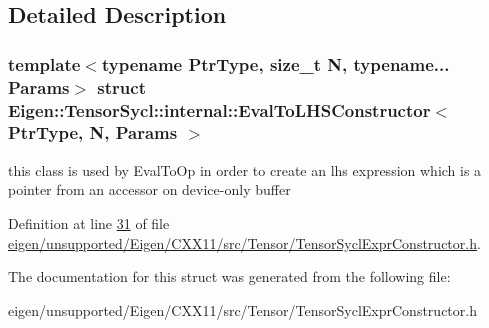 \subsection{Detailed Description}
\subsubsection*{template$<$typename Ptr\+Type, size\+\_\+t N, typename... Params$>$\newline
struct Eigen\+::\+Tensor\+Sycl\+::internal\+::\+Eval\+To\+L\+H\+S\+Constructor$<$ Ptr\+Type, N, Params $>$}

this class is used by Eval\+To\+Op in order to create an lhs expression which is a pointer from an accessor on device-\/only buffer 

Definition at line \hyperlink{eigen_2unsupported_2_eigen_2_c_x_x11_2src_2_tensor_2_tensor_sycl_expr_constructor_8h_source_l00031}{31} of file \hyperlink{eigen_2unsupported_2_eigen_2_c_x_x11_2src_2_tensor_2_tensor_sycl_expr_constructor_8h_source}{eigen/unsupported/\+Eigen/\+C\+X\+X11/src/\+Tensor/\+Tensor\+Sycl\+Expr\+Constructor.\+h}.



The documentation for this struct was generated from the following file\+:\begin{DoxyCompactItemize}
\item 
eigen/unsupported/\+Eigen/\+C\+X\+X11/src/\+Tensor/\+Tensor\+Sycl\+Expr\+Constructor.\+h\end{DoxyCompactItemize}
